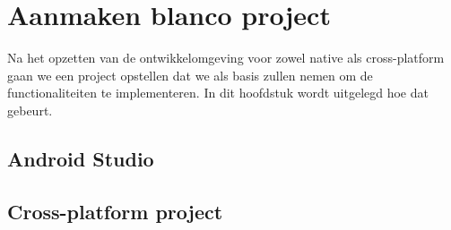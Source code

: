 
\chapter{Aanmaken blanco project}%
\label{ch:projecten}

Na het opzetten van de ontwikkelomgeving voor zowel native als cross-platform gaan 
we een project opstellen dat we als basis zullen nemen om de functionaliteiten te 
implementeren. In dit hoofdstuk wordt uitgelegd hoe dat gebeurt.

\section{Android Studio}



\section{Cross-platform project}\label{sec:projectencross}

